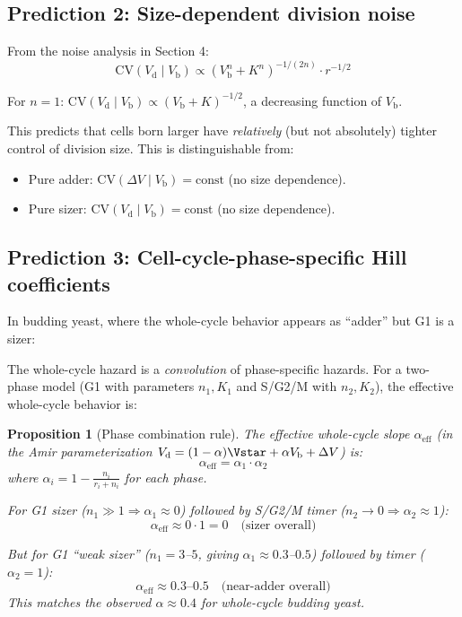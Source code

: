 \documentclass[11pt]{article}
\newcommand{\Vb}{V_{\mathrm{b}}}
\newcommand{\Vd}{V_{\mathrm{d}}}
\newcommand{\DV}{\Delta V}
\newcommand{\CV}{\mathrm{CV}}
\newtheorem{proposition}{Proposition}
\begin{document}
\subsection{Prediction 2: Size-dependent division noise}

From the noise analysis in Section 4:
\begin{equation}
  \boxed{\CV(\Vd \mid \Vb) \propto (\Vb^n + K^n)^{-1/(2n)} \cdot r^{-1/2}}
\end{equation}

For $n = 1$: $\CV(\Vd \mid \Vb) \propto (\Vb + K)^{-1/2}$, a decreasing function of $\Vb$.

This predicts that cells born larger have \emph{relatively} (but not absolutely) tighter control of division size. This is distinguishable from:
\begin{itemize}
  \item Pure adder: $\CV(\DV \mid \Vb) = \text{const}$ (no size dependence).
  \item Pure sizer: $\CV(\Vd \mid \Vb) = \text{const}$ (no size dependence).
\end{itemize}

\subsection{Prediction 3: Cell-cycle-phase-specific Hill coefficients}

In budding yeast, where the whole-cycle behavior appears as ``adder'' but G1 is a sizer:

The whole-cycle hazard is a \emph{convolution} of phase-specific hazards. For a two-phase model (G1 with parameters $n_1, K_1$ and S/G2/M with $n_2, K_2$), the effective whole-cycle behavior is:

\begin{proposition}[Phase combination rule]
The effective whole-cycle slope $\alpha_{\mathrm{eff}}$ (in the Amir parameterization $\Vd = (1-\alpha)\Vstar + \alpha\Vb + \DV$) is:
\begin{equation}
  \alpha_{\mathrm{eff}} = \alpha_1 \cdot \alpha_2
\end{equation}
where $\alpha_i = 1 - \frac{n_i}{r_i + n_i}$ for each phase.

For G1 sizer ($n_1 \gg 1 \Rightarrow \alpha_1 \approx 0$) followed by S/G2/M timer ($n_2 \to 0 \Rightarrow \alpha_2 \approx 1$):
\begin{equation}
  \alpha_{\mathrm{eff}} \approx 0 \cdot 1 = 0 \quad \text{(sizer overall)}
\end{equation}

But for G1 ``weak sizer'' ($n_1 = 3$--$5$, giving $\alpha_1 \approx 0.3$--$0.5$) followed by timer ($\alpha_2 = 1$):
\begin{equation}
  \alpha_{\mathrm{eff}} \approx 0.3\text{--}0.5 \quad \text{(near-adder overall)}
\end{equation}
This matches the observed $\alpha \approx 0.4$ for whole-cycle budding yeast.
\end{proposition}
\end{document}
